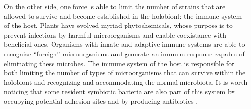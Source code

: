 On the other side, one force is able to limit the number of strains that are allowed to survive and become established in the holobiont: the immune system of the host. Plants have evolved myriad phytochemicals, whose purpose is to prevent infections by harmful microorganisms and enable coexistance with beneficial ones. Organisms with innate and adaptive immune systems are able to recognize ``foreign'' microorganisms and generate an immune response capable of eliminating these microbes. The immune system of the host is responsible for both limiting the number of types of microorganisms that can survive within the holobiont and recognizing and accommodating the normal microbiota. It is worth noticing that some resident symbiotic bacteria are also part of this system by occupying potential adhesion sites and by producing antibiotics \cite{ritchie2006regulation}.\\

